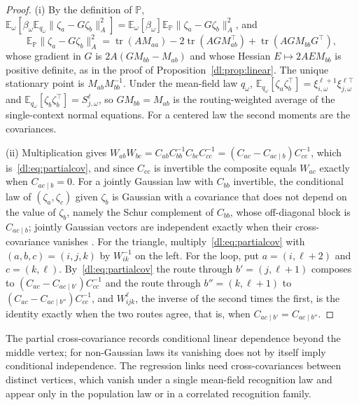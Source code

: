 \documentclass[11pt]{article}
\theoremstyle{definition}
\theoremstyle{remark}
\providecommand{\tr}{\operatorname{tr}}
\newcommand{\E}{\mathbb E}
\begin{document}
\begin{proof}
(i) By the definition of $\mathbb P$, $\E_\omega[\beta_\omega\E_{q_\omega}\|\zeta_a-G\zeta_b\|_A^2]=\E_\omega[\beta_\omega]\E_{\mathbb P}\|\zeta_a-G\zeta_b\|_A^2$, and
\begin{equation*}
\E_{\mathbb P}\|\zeta_a-G\zeta_b\|_A^2=\tr(AM_{aa})-2\tr(AGM_{ab}^\top)+\tr(AGM_{bb}G^\top),
\end{equation*}
whose gradient in $G$ is $2A(GM_{bb}-M_{ab})$ and whose Hessian $E\mapsto2AEM_{bb}$ is positive definite, as in the proof of Proposition~\ref{dl:prop:linear}. The unique stationary point is $M_{ab}M_{bb}^{-1}$. Under the mean-field law $q_\omega$, $\E_{q_\omega}[\zeta_a\zeta_b^\top]=\xi_{i,\omega}^{\ell+1}\xi_{j,\omega}^{\ell\top}$ and $\E_{q_\omega}[\zeta_b\zeta_b^\top]=S_{j,\omega}^\ell$, so $GM_{bb}=M_{ab}$ is the routing-weighted average of the single-context normal equations. For a centered law the second moments are the covariances.

(ii) Multiplication gives $W_{ab}W_{bc}=C_{ab}C_{bb}^{-1}C_{bc}C_{cc}^{-1}=(C_{ac}-C_{ac\mid b})C_{cc}^{-1}$, which is~\eqref{dl:eq:partialcov}, and since $C_{cc}$ is invertible the composite equals $W_{ac}$ exactly when $C_{ac\mid b}=0$. For a jointly Gaussian law with $C_{bb}$ invertible, the conditional law of $(\zeta_a,\zeta_c)$ given $\zeta_b$ is Gaussian with a covariance that does not depend on the value of $\zeta_b$, namely the Schur complement of $C_{bb}$, whose off-diagonal block is $C_{ac\mid b}$; jointly Gaussian vectors are independent exactly when their cross-covariance vanishes \cite{dl:lauritzen1996}. For the triangle, multiply~\eqref{dl:eq:partialcov} with $(a,b,c)=(i,j,k)$ by $W_{ik}^{-1}$ on the left. For the loop, put $a=(i,\ell+2)$ and $c=(k,\ell)$. By~\eqref{dl:eq:partialcov} the route through $b'=(j,\ell+1)$ composes to $(C_{ac}-C_{ac\mid b'})C_{cc}^{-1}$ and the route through $b''=(k,\ell+1)$ to $(C_{ac}-C_{ac\mid b''})C_{cc}^{-1}$, and $W_{ijk}^\ell$, the inverse of the second times the first, is the identity exactly when the two routes agree, that is, when $C_{ac\mid b'}=C_{ac\mid b''}$.
\end{proof}

The partial cross-covariance records conditional linear dependence beyond the middle vertex; for non-Gaussian laws its vanishing does not by itself imply conditional independence. The regression links need cross-covariances between distinct vertices, which vanish under a single mean-field recognition law and appear only in the population law or in a correlated recognition family.
\end{document}
